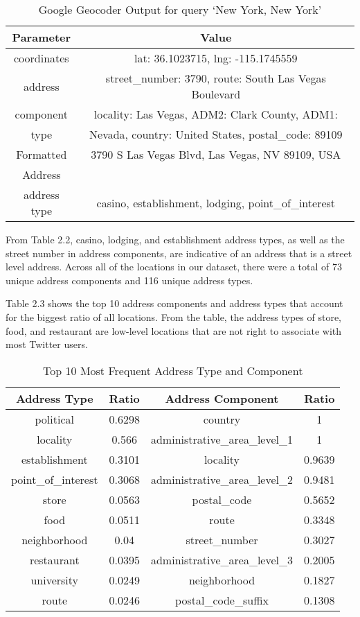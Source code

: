 \begin{table}
\small
\renewcommand{\arraystretch}{1.2}
\caption{Google Geocoder Output for query `New York, New York'}
\label{table_ch2_2}
\centering
\begin{tabular}{|c|c|}
\hline
\bfseries Parameter & \bfseries Value\\
\hline
coordinates & lat: 36.1023715, lng: -115.1745559\\
\hline
address & street\_number: 3790, route: South Las Vegas Boulevard\\
component & locality: Las Vegas, ADM2: Clark County, ADM1:\\
type & Nevada, country: United States, postal\_code: 89109\\
\hline
Formatted & 3790 S Las Vegas Blvd, Las Vegas, NV 89109, USA\\
Address &\\
\hline
address type & casino, establishment, lodging, point\_of\_interest\\
\hline
\end{tabular}
\end{table}

From Table 2.2, casino, lodging, and establishment address types, as well as the street number in address components, are indicative of an address that is a street level address. Across all of the locations in our dataset, there were a total of 73 unique address components and 116 unique address types.

Table 2.3 shows the top 10 address components and address types that account for the biggest ratio of all locations. From the table, the address types of store, food, and restaurant are low-level locations that are not right to associate with most Twitter users.

\begin{table}
\small
\renewcommand{\arraystretch}{1.2}
\caption{Top 10 Most Frequent Address Type and Component}
\label{table_ch2_3}
\centering
\begin{tabular}{|c|c|c|c|}
\hline
\bfseries Address Type & \bfseries Ratio & \bfseries Address Component & \bfseries Ratio \\
\hline
political&0.6298&country&1\\
\hline
locality&0.566&administrative\_area\_level\_1&1\\
\hline
establishment&0.3101&locality&0.9639\\
\hline
point\_of\_interest&0.3068&administrative\_area\_level\_2&0.9481\\
\hline
store&0.0563&postal\_code&0.5652\\
\hline
food&0.0511&route&0.3348\\
\hline
neighborhood&0.04&street\_number&0.3027\\
\hline
restaurant&0.0395&administrative\_area\_level\_3&0.2005\\
\hline
university&0.0249&neighborhood&0.1827\\
\hline
route&0.0246&postal\_code\_suffix&0.1308\\
\hline
\end{tabular}
\end{table}

